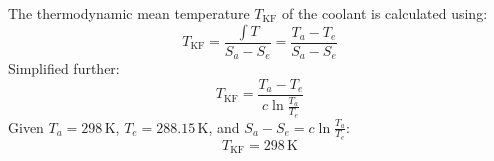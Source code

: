 The thermodynamic mean temperature \( T_{\text{KF}} \) of the coolant is calculated using:  
\[
T_{\text{KF}} = \frac{\int T}{S_a - S_e} = \frac{T_a - T_e}{S_a - S_e}
\]  
Simplified further:  
\[
T_{\text{KF}} = \frac{T_a - T_e}{c \ln \frac{T_a}{T_e}}
\]  
Given \( T_a = 298 \, \text{K} \), \( T_e = 288.15 \, \text{K} \), and \( S_a - S_e = c \ln \frac{T_a}{T_e} \):  
\[
T_{\text{KF}} = 298 \, \text{K}
\]